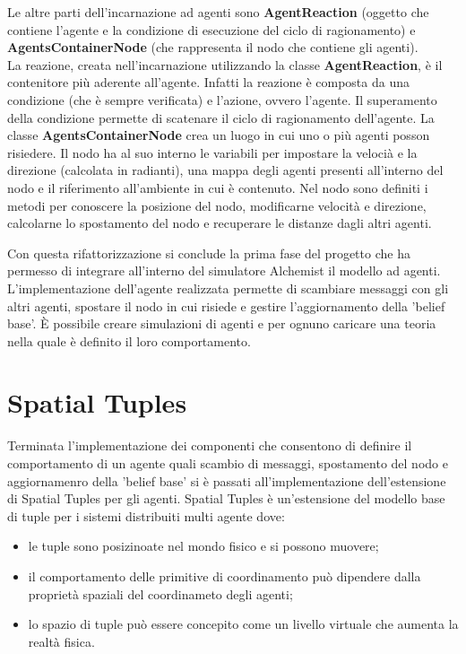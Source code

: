 \documentclass[12pt,a4paper,openright,twoside]{report}
\begin{document}
Le altre parti dell'incarnazione ad agenti sono \textbf{AgentReaction} (oggetto che contiene l'agente e la condizione di esecuzione del ciclo di ragionamento) e \textbf{AgentsContainerNode} (che rappresenta il nodo che contiene gli agenti).
\\
La reazione, creata nell'incarnazione utilizzando la classe \textbf{AgentReaction}, \`e il contenitore pi\`u aderente all'agente. Infatti la reazione \`e composta da una condizione (che \`e sempre verificata) e l'azione, ovvero l'agente. Il superamento della condizione permette di scatenare il ciclo di ragionamento dell'agente.
La classe \textbf{AgentsContainerNode} crea un luogo in cui uno o pi\`u agenti posson risiedere. Il nodo ha al suo interno le variabili per impostare la veloci\`a e la direzione (calcolata in radianti), una mappa degli agenti presenti all'interno del nodo e il riferimento all'ambiente in cui \`e contenuto. Nel nodo sono definiti i metodi per conoscere la posizione del nodo, modificarne velocit\`a e direzione, calcolarne lo spostamento del nodo e recuperare le distanze dagli altri agenti.

\bigskip

Con questa rifattorizzazione si conclude la prima fase del progetto che ha permesso di integrare all'interno del simulatore Alchemist il modello ad agenti. L'implementazione dell'agente realizzata permette di scambiare messaggi con gli altri agenti, spostare il nodo in cui risiede e gestire l'aggiornamento della 'belief base'. \`E possibile creare simulazioni di agenti e per ognuno caricare una teoria nella quale \`e definito il loro comportamento.

\chapter{Spatial Tuples}
Terminata l'implementazione dei componenti che consentono di definire il comportamento di un agente quali scambio di messaggi, spostamento del nodo e aggiornamenro della 'belief base' si \`e passati all'implementazione dell'estensione di Spatial Tuples per gli agenti.
Spatial Tuples \`e un'estensione del modello base di tuple per i sistemi distribuiti multi agente dove:
\begin{itemize}
   \item le tuple sono posizinoate nel mondo fisico e si possono muovere;
   \item il comportamento delle primitive di coordinamento pu\`o dipendere dalla propriet\`a spaziali del coordinameto degli agenti;
   \item lo spazio di tuple pu\`o essere concepito come un livello virtuale che aumenta la realt\`a fisica.
\end{itemize}
\end{document}
